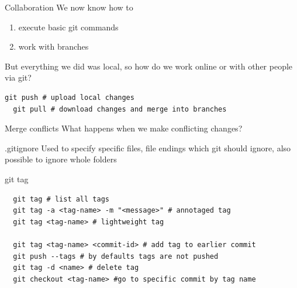 \documentclass{beamer}
\begin{document}
\begin{frame}[fragile,t]{Collaboration}\vspace{10pt}
  We now know how to 
  \begin{enumerate}
    \item execute basic git commands
    \item work with branches
  \end{enumerate}\vspace{10pt}
  But everything we did was local, so how do we work online or with other people via git?

  \begin{lstlisting}[basicstyle=\ttfamily\tiny]
  git push # upload local changes
  git pull # download changes and merge into branches\end{lstlisting}\vspace{10pt}

\end{frame}


\begin{frame}[fragile,t]{Merge conflicts}\vspace{10pt}
  What happens when we make conflicting changes?


\end{frame}

\begin{frame}[fragile,t]{.gitignore}\vspace{10pt}
  Used to specify specific files, file endings which git should ignore, also possible to ignore whole folders
\end{frame}

\begin{frame}[fragile,t]{git tag}\vspace{10pt}
  \begin{lstlisting}
  git tag # list all tags
  git tag -a <tag-name> -m "<message>" # annotaged tag
  git tag <tag-name> # lightweight tag

  git tag <tag-name> <commit-id> # add tag to earlier commit
  git push --tags # by defaults tags are not pushed
  git tag -d <name> # delete tag
  git checkout <tag-name> #go to specific commit by tag name\end{lstlisting}
\end{frame}
\end{document}
